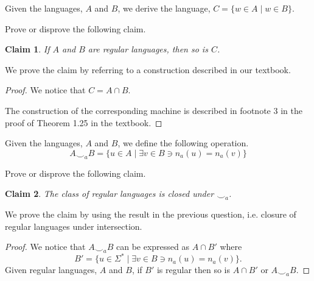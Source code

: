 \documentclass[addpoints]{exam}
\theoremstyle{claim}
\newtheorem{claim}{Claim}
\begin{document}
\begin{questions}
\begin{solution}
  \end{solution}

  
\question[30] Given the languages, $A$ and $B$, we derive the language, $C = \{ w\in A \mid w \in B \}$.

  Prove or disprove the following claim.
  \begin{claim}
    If $A$ and $B$ are regular languages, then so is $C$.
  \end{claim}
  
  \begin{solution}
    We prove the claim by referring to a construction described in our textbook.

    \begin{proof}
      We notice that $C = A \cap B$.

      The construction of the corresponding machine is described in footnote 3 in the proof of Theorem 1.25 in the textbook.
    \end{proof}
  \end{solution}
  
\question[35] Given the languages, $A$ and $B$, we define the following operation.
  \[
    A\smile_a B = \{ u\in A \mid \exists v\in B \ni n_a(u) = n_a(v) \}
  \]

  Prove or disprove the following claim.
  \begin{claim}
    The class of regular languages is closed under $\smile_a$.
  \end{claim}

  \begin{solution}
    We prove the claim by using the result in the previous question, i.e. closure of regular languages under intersection.

    \begin{proof}
    We notice that $A\smile_a B$ can be expressed as $A \cap B'$ where   
    \[
      B' = \{ u\in \Sigma^* \mid \exists v\in B \ni n_a(u) = n_a(v) \}.
    \]
    Given regular languages, $A$ and $B$, if $B'$ is regular then so is $A \cap B'$ or $A\smile_a B$.


\end{proof}
\end{solution}
\end{questions}
\end{document}
